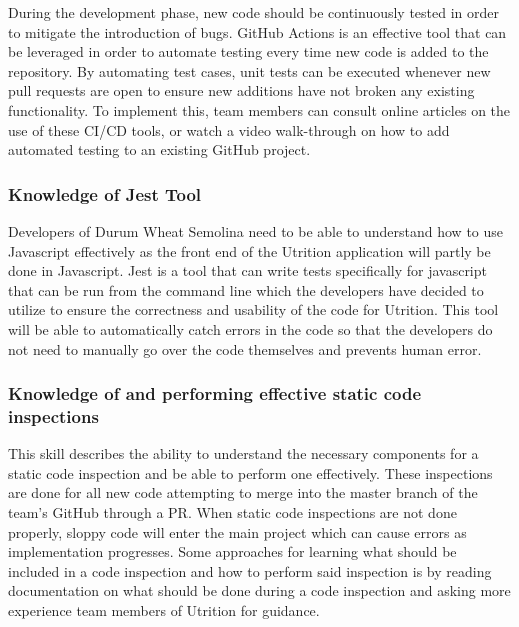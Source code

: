 \documentclass[12pt, titlepage]{article}
\begin{document}
	During the development phase, new code should be continuously tested in 
	order to mitigate the introduction of bugs. GitHub Actions is an effective 
	tool that can be leveraged in order to automate testing every time new 
	code is added to the repository. By automating test cases, unit tests can 
	be executed whenever new pull requests are open to ensure new additions 
	have not broken any existing functionality. To implement this, team members 
	can consult online articles on the use of these CI/CD tools, or watch a 
	video walk-through on how to add automated testing to an existing GitHub 
	project.
	\subsubsection*{Knowledge of Jest Tool} 
	Developers of Durum Wheat Semolina need to be able to understand how to use Javascript effectively as the front end of the Utrition application will partly be done in Javascript. Jest is a tool that can write tests specifically for javascript that can be run from the command line which the developers have decided to utilize to ensure the correctness and usability of the code for Utrition. This tool will be able to automatically catch errors in the code so that the developers do not need to manually go over the code themselves and prevents human error. 
	
	\subsubsection*{Knowledge of and performing effective static code inspections}
	This skill describes the ability to understand the necessary components for a static code inspection and be able to perform one effectively. These inspections are done for all new code attempting to merge into the master branch of the team's GitHub through a PR. When static code inspections are not done properly, sloppy code will enter the main project which can cause errors as implementation progresses. Some approaches for learning what should be included in a code inspection and how to perform said inspection is by reading documentation on what should be done during a code inspection and asking more experience team members of Utrition for guidance.
	
\end{document}
